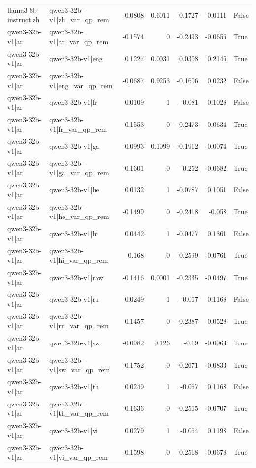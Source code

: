 \begin{table}
\begin{tabular}{l l r r r r l}
llama3-8b-instruct|zh & qwen3-32b-v1|zh_var_qp_rem & -0.0808 & 0.6011 & -0.1727 & 0.0111 & False \\
qwen3-32b-v1|ar & qwen3-32b-v1|ar_var_qp_rem & -0.1574 & 0 & -0.2493 & -0.0655 & True \\
qwen3-32b-v1|ar & qwen3-32b-v1|eng & 0.1227 & 0.0031 & 0.0308 & 0.2146 & True \\
qwen3-32b-v1|ar & qwen3-32b-v1|eng_var_qp_rem & -0.0687 & 0.9253 & -0.1606 & 0.0232 & False \\
qwen3-32b-v1|ar & qwen3-32b-v1|fr & 0.0109 & 1 & -0.081 & 0.1028 & False \\
qwen3-32b-v1|ar & qwen3-32b-v1|fr_var_qp_rem & -0.1553 & 0 & -0.2473 & -0.0634 & True \\
qwen3-32b-v1|ar & qwen3-32b-v1|ga & -0.0993 & 0.1099 & -0.1912 & -0.0074 & True \\
qwen3-32b-v1|ar & qwen3-32b-v1|ga_var_qp_rem & -0.1601 & 0 & -0.252 & -0.0682 & True \\
qwen3-32b-v1|ar & qwen3-32b-v1|he & 0.0132 & 1 & -0.0787 & 0.1051 & False \\
qwen3-32b-v1|ar & qwen3-32b-v1|he_var_qp_rem & -0.1499 & 0 & -0.2418 & -0.058 & True \\
qwen3-32b-v1|ar & qwen3-32b-v1|hi & 0.0442 & 1 & -0.0477 & 0.1361 & False \\
qwen3-32b-v1|ar & qwen3-32b-v1|hi_var_qp_rem & -0.168 & 0 & -0.2599 & -0.0761 & True \\
qwen3-32b-v1|ar & qwen3-32b-v1|raw & -0.1416 & 0.0001 & -0.2335 & -0.0497 & True \\
qwen3-32b-v1|ar & qwen3-32b-v1|ru & 0.0249 & 1 & -0.067 & 0.1168 & False \\
qwen3-32b-v1|ar & qwen3-32b-v1|ru_var_qp_rem & -0.1457 & 0 & -0.2387 & -0.0528 & True \\
qwen3-32b-v1|ar & qwen3-32b-v1|sw & -0.0982 & 0.126 & -0.19 & -0.0063 & True \\
qwen3-32b-v1|ar & qwen3-32b-v1|sw_var_qp_rem & -0.1752 & 0 & -0.2671 & -0.0833 & True \\
qwen3-32b-v1|ar & qwen3-32b-v1|th & 0.0249 & 1 & -0.067 & 0.1168 & False \\
qwen3-32b-v1|ar & qwen3-32b-v1|th_var_qp_rem & -0.1636 & 0 & -0.2565 & -0.0707 & True \\
qwen3-32b-v1|ar & qwen3-32b-v1|vi & 0.0279 & 1 & -0.064 & 0.1198 & False \\
qwen3-32b-v1|ar & qwen3-32b-v1|vi_var_qp_rem & -0.1598 & 0 & -0.2518 & -0.0678 & True \\

\end{tabular}
\end{table}
